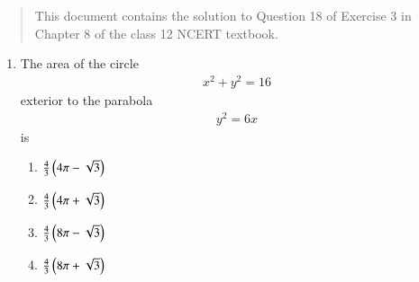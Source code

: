 \documentclass[journal,12pt,twocolumn]{IEEEtran}
\begin{document}
\begin{abstract}
    This document contains the solution to Question 18 of 
    Exercise 3 in Chapter 8 of the class 12 NCERT textbook.
\end{abstract}

\begin{enumerate}
    \item The area of the circle 
    \begin{align}
        x^2 + y^2 = 16 
        \label{eq:circle}
    \end{align}
    exterior to the parabola 
    \begin{align}
        y^2 = 6x 
        \label{eq:parabola}
    \end{align}
    is 
    \begin{enumerate}
        \item $\frac{4}{3}\left(4\pi-\sqrt{3}\right)$
        \item $\frac{4}{3}\left(4\pi+\sqrt{3}\right)$
        \item $\frac{4}{3}\left(8\pi-\sqrt{3}\right)$
        \item $\frac{4}{3}\left(8\pi+\sqrt{3}\right)$
    \end{enumerate}


\end{enumerate}
\end{document}
